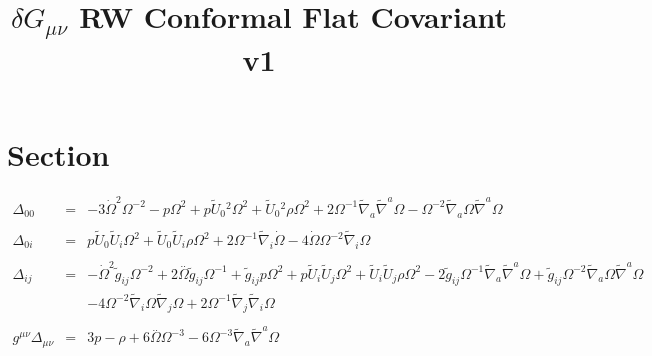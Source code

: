 \documentclass[10pt,letterpaper]{article}
\title{$\delta G_{\mu\nu}$ RW Conformal Flat Covariant v1}
\date{}
\numberwithin{equation}{section}
\begin{document}
 
\maketitle
\noindent 
\section{Section}
\begin{eqnarray}
\Delta_{00} &=& -3 \dot{\Omega}^2 \Omega^{-2} -  p \Omega^2 + p \tilde{U}_{0}{}^2 \Omega^2 + \tilde{U}_{0}{}^2 \rho \Omega^2 + 2 \Omega^{-1} \tilde{\nabla}_{a}\tilde{\nabla}^{a}\Omega -  \Omega^{-2} \tilde{\nabla}_{a}\Omega \tilde{\nabla}^{a}\Omega 
\\ \nonumber\\
\Delta_{0i} &=& p \tilde{U}_{0}{} \tilde{U}_{i} \Omega^2 + \tilde{U}_{0}{} \tilde{U}_{i} \rho \Omega^2 + 2 \Omega^{-1} \tilde{\nabla}_{i}\dot{\Omega} - 4 \dot{\Omega} \Omega^{-2} \tilde{\nabla}_{i}\Omega 
\\ \nonumber\\
\Delta_{ij} &=& - \dot{\Omega}^2 \tilde{g}_{ij} \Omega^{-2} + 2 \overset{..}{\Omega} \tilde{g}_{ij} \Omega^{-1} + \tilde{g}_{ij} p \Omega^2 + p \tilde{U}_{i} \tilde{U}_{j} \Omega^2 + \tilde{U}_{i} \tilde{U}_{j} \rho \Omega^2 - 2 \tilde{g}_{ij} \Omega^{-1} \tilde{\nabla}_{a}\tilde{\nabla}^{a}\Omega + \tilde{g}_{ij} \Omega^{-2} \tilde{\nabla}_{a}\Omega \tilde{\nabla}^{a}\Omega \nonumber\\
&& - 4 \Omega^{-2} \tilde{\nabla}_{i}\Omega \tilde{\nabla}_{j}\Omega + 2 \Omega^{-1} \tilde{\nabla}_{j}\tilde{\nabla}_{i}\Omega 
\\ \nonumber\\
g^{\mu\nu}\Delta_{\mu\nu} &=&3 p -  \rho + 6 \overset{..}{\Omega} \Omega^{-3} - 6 \Omega^{-3} \tilde{\nabla}_{a}\tilde{\nabla}^{a}\Omega 
\end{eqnarray}
\end{document}
